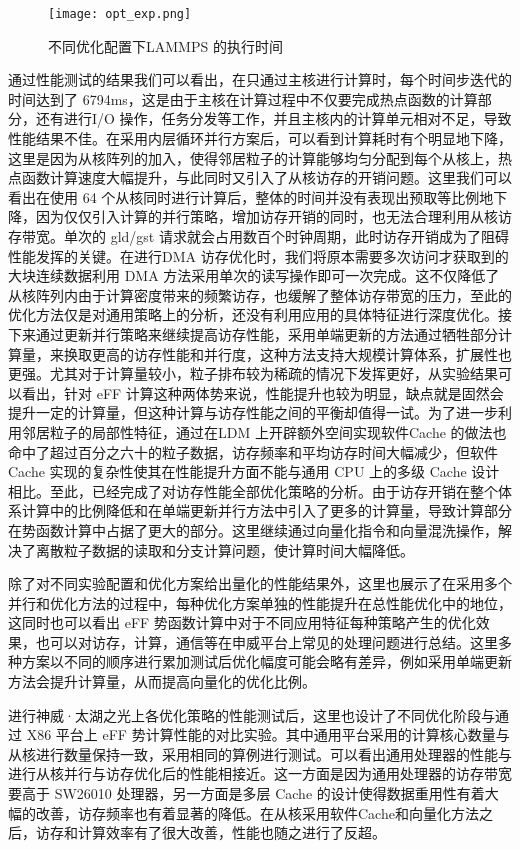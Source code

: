  \begin{figure}[h]
  \centering
  \texttt{[image: opt\_exp.png]}
  \caption{不同优化配置下LAMMPS 的执行时间}
\end{figure}

通过性能测试的结果我们可以看出，在只通过主核进行计算时，每个时间步迭代的时间达到了 6794ms，这是由于主核在计算过程中不仅要完成热点函数的计算部分，还有进行I/O 操作，任务分发等工作，并且主核内的计算单元相对不足，导致性能结果不佳。在采用内层循环并行方案后，可以看到计算耗时有个明显地下降，这里是因为从核阵列的加入，使得邻居粒子的计算能够均匀分配到每个从核上，热点函数计算速度大幅提升，与此同时又引入了从核访存的开销问题。这里我们可以看出在使用 64 个从核同时进行计算后，整体的时间并没有表现出预取等比例地下降，因为仅仅引入计算的并行策略，增加访存开销的同时，也无法合理利用从核访存带宽。单次的 gld/gst 请求就会占用数百个时钟周期，此时访存开销成为了阻碍性能发挥的关键。在进行DMA 访存优化时，我们将原本需要多次访问才获取到的大块连续数据利用 DMA 方法采用单次的读写操作即可一次完成。这不仅降低了从核阵列内由于计算密度带来的频繁访存，也缓解了整体访存带宽的压力，至此的优化方法仅是对通用策略上的分析，还没有利用应用的具体特征进行深度优化。接下来通过更新并行策略来继续提高访存性能，采用单端更新的方法通过牺牲部分计算量，来换取更高的访存性能和并行度，这种方法支持大规模计算体系，扩展性也更强。尤其对于计算量较小，粒子排布较为稀疏的情况下发挥更好，从实验结果可以看出，针对 eFF 计算这种两体势来说，性能提升也较为明显，缺点就是固然会提升一定的计算量，但这种计算与访存性能之间的平衡却值得一试。为了进一步利用邻居粒子的局部性特征，通过在LDM 上开辟额外空间实现软件Cache 的做法也命中了超过百分之六十的粒子数据，访存频率和平均访存时间大幅减少，但软件Cache 实现的复杂性使其在性能提升方面不能与通用 CPU 上的多级 Cache 设计相比。至此，已经完成了对访存性能全部优化策略的分析。由于访存开销在整个体系计算中的比例降低和在单端更新并行方法中引入了更多的计算量，导致计算部分在势函数计算中占据了更大的部分。这里继续通过向量化指令和向量混洗操作，解决了离散粒子数据的读取和分支计算问题，使计算时间大幅降低。

除了对不同实验配置和优化方案给出量化的性能结果外，这里也展示了在采用多个并行和优化方法的过程中，每种优化方案单独的性能提升在总性能优化中的地位，这同时也可以看出 eFF 势函数计算中对于不同应用特征每种策略产生的优化效果，也可以对访存，计算，通信等在申威平台上常见的处理问题进行总结。这里多种方案以不同的顺序进行累加测试后优化幅度可能会略有差异，例如采用单端更新方法会提升计算量，从而提高向量化的优化比例。

进行神威·太湖之光上各优化策略的性能测试后，这里也设计了不同优化阶段与通过 X86 平台上 eFF 势计算性能的对比实验。其中通用平台采用的计算核心数量与从核进行数量保持一致，采用相同的算例进行测试。可以看出通用处理器的性能与进行从核并行与访存优化后的性能相接近。这一方面是因为通用处理器的访存带宽要高于 SW26010 处理器，另一方面是多层 Cache 的设计使得数据重用性有着大幅的改善，访存频率也有着显著的降低。在从核采用软件Cache和向量化方法之后，访存和计算效率有了很大改善，性能也随之进行了反超。

